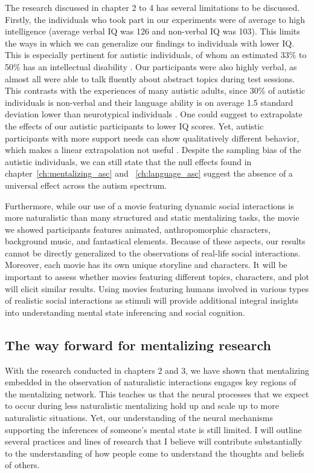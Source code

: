 The research discussed in chapter 2 to 4 has several limitations to be discussed. Firstly, the individuals who took part in our experiments were of average to high intelligence (average verbal IQ was 126 and non-verbal IQ was 103). This limits the ways in which we can generalize our findings to individuals with lower IQ. This is especially pertinent for autistic individuals, of whom an estimated 33\% to 50\% has an intellectual disability \citep{katusic2021,shenouda2023}. Our participants were also highly verbal, as almost all were able to talk fluently about abstract topics during test sessions. This contrasts with the experiences of many autistic adults, since 30\% of autistic individuals is non-verbal and their language ability is on average 1.5 standard deviation lower than neurotypical individuals \citep{kwok2015,anderson2007}. One could suggest to extrapolate the effects of our autistic participants to lower IQ scores. Yet, autistic participants with more support needs can show qualitatively different behavior, which makes a linear extrapolation not useful \citep{wenar1986}. Despite the sampling bias of the autistic individuals, we can still state that the null effects found in chapter~\ref{ch:mentalizing_asc} and ~\ref{ch:language_asc} suggest the absence of a universal effect across the autism spectrum.

Furthermore, while our use of a movie featuring dynamic social interactions is more naturalistic than many structured and static mentalizing tasks, the movie we showed participants features animated, anthropomorphic characters, background music, and fantastical elements. Because of these aspects, our results cannot be directly generalized to the observations of real-life social interactions. Moreover, each movie has its own unique storyline and characters. It will be important to assess whether movies featuring different topics, characters, and plot will elicit similar results. Using movies featuring humans involved in various types of realistic social interactions as stimuli will provide additional integral insights into understanding mental state inferencing and social cognition.

\subsection*{The way forward for mentalizing research}

With the research conducted in chapters 2 and 3, we have shown that mentalizing embedded in the observation of naturalistic interactions engages key regions of the mentalizing network. This teaches us that the neural processes that we expect to occur during less naturalistic mentalizing hold up and scale up to more naturalistic situations. Yet, our understanding of the neural mechanisms supporting the inferences of someone's mental state is still limited. I will outline several practices and lines of research that I believe will contribute substantially to the understanding of how people come to understand the thoughts and beliefs of others.


